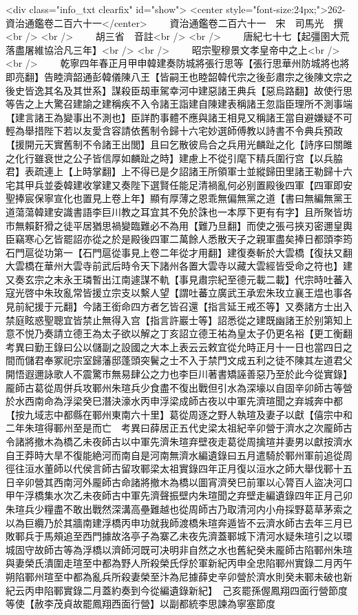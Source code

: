<div class="info_txt clearfix" id="show">
<center style="font-size:24px;">262-資治通鑑卷二百六十一</center>
  　　資治通鑑卷二百六十一　宋　司馬光　撰<br />
<br />
　　胡三省　音註<br />
<br />
　　唐紀七十七【起彊圉大荒落盡屠維協洽凡三年】<br />
<br />
　　昭宗聖穆景文孝皇帝中之上<br />
<br />
　　乾寧四年春正月甲申韓建奏防城將張行思等【張行思華州防城將也將即亮翻】告睦濟韶通彭韓儀陳八王【皆嗣王也睦韶韓代宗之後彭肅宗之後陳文宗之後史皆逸其名及其世系】謀殺臣刼車駕幸河中建惡諸王典兵【惡烏路翻】故使行思等告之上大驚召建諭之建稱疾不入令諸王詣建自陳建表稱諸王忽詣臣理所不測事端【建言諸王為變事出不測也】臣詳酌事體不應與諸王相見又稱諸王當自避嫌疑不可輕為舉措陛下若以友愛含容請依舊制令歸十六宅妙選師傅教以詩書不令典兵預政【援開元天實舊制不令諸王出閭】且曰乞散彼烏合之兵用光麟趾之化【詩序曰關雎之化行雖衰世之公子皆信厚如麟趾之時】建慮上不從引麾下精兵圍行宫【以兵脇君】表疏連上【上時掌翻】上不得已是夕詔諸王所領軍士並縱歸田里諸王勒歸十六宅其甲兵並委韓建收掌建又奏陛下選賢任能足清禍亂何必别置殿後四軍【四軍即安聖捧宸保寧宣化也置見上卷上年】顯有厚薄之恩乖無偏無黨之道【書曰無編無黨王道蕩蕩韓建安識書語李巨川教之耳宜其不免於誅也一本厚下更有有字】且所聚皆坊市無賴姧猾之徒平居猶思禍變臨難必不為用【難乃旦翻】而使之張弓挾刃密邇皇輿臣竊寒心乞皆罷詔亦從之於是殿後四軍二萬餘人悉散天子之親軍盡矣捧日都頭李筠石門扈從功第一【石門扈從事見上卷二年從才用翻】建復奏斬於大雲橋【復扶又翻大雲橋在華州大雲寺前武后時令天下諸州各置大雲寺以藏大雲經皆受命之符也】建又奏玄宗之末永王璘暫出江南遽謀不軌【事見肅宗紀至德元載二載】代宗時吐蕃入寇光啓中朱玫亂常皆援立宗支以繫人望【謂吐蕃立廣武王承宏朱玫立襄王煴也事各見前紀援于元翻】今諸王銜命四方者乞皆召還【指言延王戒丕等】又奏諸方士出入禁庭眩惑聖聰宜皆禁止無得入宫【指言許巖士等】詔悉從之建既幽諸王於别第知上意不悦乃奏請立德王為太子欲以解之丁亥詔立德王祐為皇太子仍更名裕【更工衡翻　考異曰勤王錄曰公以儲副之設國之大本上表云云敕宜從允時正月十一日也當四日之間而儲君奉冢祀宗室歸藩邸蓬頭突鬢之士不入于禁門文成五利之徒不陳其左道君父開悟遐邇詠歌人不震驚市無易肆公之力也李巨川著書矯誣善惡乃至於此今從實錄】　龎師古葛從周併兵攻鄆州朱瑄兵少食盡不復出戰但引水為深壕以自固辛卯師古等營於水西南命為浮梁癸巳潛決濠水丙申浮梁成師古夜以中軍先濟瑄聞之弃城奔中都【按九域志中都縣在鄆州東南六十里】葛從周逐之野人執瑄及妻子以獻【僖宗中和二年朱瑄得鄆州至是而亡　考異曰薛居正五代史梁太祖紀辛卯營于濟水之次龎師古令諸將撤木為橋乙未夜師古以中軍先濟朱瑄弃壁夜走葛從周擒瑄并妻男以獻按濟水自王莽時大旱不復能絶河而南自是河南無濟水編遺錄曰五月遣騎於鄆州軍前追從周徑往洹水董師以代侯言師古留攻鄆梁太祖實錄四年正月復以洹水之師大舉伐鄆十五日辛卯營其西南河外龎師古命諸將撤木為橋以圖宵濟癸巳前軍以心膂百人盜决河口甲午浮橋集水次乙未夜師古中軍先濟聲振壁内朱瑄聞之弃壁走編遺錄四年正月己卯朱瑄兵少糧盡不敢出戰然深溝高壘難越也從周師古乃取清河内小舟採野葛草茅索之以為巨纜乃於其牆南建浮橋丙申功就我師渡橋朱瑄奔遁皆不云濟水師古去年三月已敗鄆兵于馬頰追至西門據故洛亭子為寨乙未夜先濟蓋鄆城下清河水疑朱瑄引之以環城固守故師古等為浮橋以濟師河既可决明非自然之水也舊紀癸未龎師古陷鄆州朱瑄與妻榮氏潰圍走瑄至中都為野人所殺榮氏俘於軍新紀丙申全忠陷鄆州實錄二月丙午朔陷鄆州瑄至中都為亂兵所殺妻榮至汴為尼據薛史辛卯營於濟水則癸未鄆未破也新紀云丙申陷鄆實錄二月蓋約奏到今從編遺錄新紀】　己亥罷孫偓鳳翔四面行營節度等使【赦李茂貞故罷鳳翔西面行營】以副都統李思諫為寧塞節度
